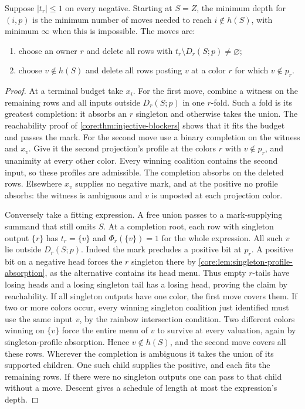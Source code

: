 \begin{theorem}\label{core:thm:completion-depth}
Suppose $|t_r|\le1$ on every negative. Starting at $S=Z$, the minimum
depth for $(i,p)$ is the minimum number of moves needed to reach
$i\notin h(S)$, with minimum $\infty$ when this is impossible.
The moves are:
\begin{enumerate}
\item choose an owner $r$ and delete all rows with
      $t_r\setminus D_r(S;p)\ne\varnothing$;
\item choose $v\notin h(S)$ and delete all rows posting $v$ at a
      color $r$ for which $v\notin p_r$.
\end{enumerate}
\end{theorem}
\begin{proof}
At a terminal budget take $x_i$. For the first move, combine a
witness on the remaining rows and all inputs outside $D_r(S;p)$ in
one $r$-fold. Such a fold is its greatest completion: it absorbs an
$r$ singleton and otherwise takes the union. The reachability proof
of \cref{core:thm:injective-blockers} shows that it fits the budget
and passes the mark. For the second move use a binary completion on
the witness and $x_v$. Give it the second projection's profile at the
colors $r$ with $v\notin p_r$, and unanimity at every other color.
Every winning coalition contains the second input, so these profiles
are admissible. The completion absorbs on the deleted rows.
Elsewhere $x_v$ supplies no negative mark, and at the positive no
profile absorbs: the witness is ambiguous and $v$ is unposted at
each projection color.

Conversely take a fitting expression. A free union passes to a
mark-supplying summand that still omits $S$. At a completion root,
each row with singleton output $\{r\}$ has $t_r=\{v\}$ and
$\Phi_r(\{v\})=1$ for the whole expression. All such $v$ lie outside
$D_r(S;p)$. Indeed the mark precludes a positive bit at $p_r$.
A positive bit on a negative head forces the $r$ singleton there
by \cref{core:lem:singleton-profile-absorption}, as the alternative
contains its head menu. Thus empty $r$-tails have losing heads and a
losing singleton tail has a losing head, proving the claim by reachability.
If all singleton outputs have one color, the first move covers them.
If two or more colors occur, every winning singleton coalition just
identified must use the same input $v$, by the rainbow intersection
condition. Two different colors winning on $\{v\}$ force the entire
menu of $v$ to survive at every valuation, again by singleton-profile
absorption. Hence $v\notin h(S)$, and the second move covers all
these rows. Wherever the completion is ambiguous it takes the union
of its supported children. One such child supplies the positive, and
each fits the remaining rows. If there were no singleton outputs one
can pass to that child without a move. Descent gives a schedule of
length at most the expression's depth.
\end{proof}

